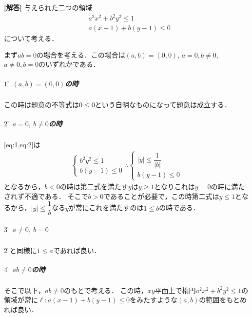 \documentclass[../../main.tex]{subfiles}
\begin{document}
\begin{oframed}
  
\end{oframed}

{\bf [解答]}
与えられた二つの領域
\begin{align}
  & a^2x^2 + b^2y^2 \le 1 \label{eq:1} \\
  & a(x-1) + b(y-1) \le 0 \label{eq:2}
\end{align}
について考える．

まず$ab=0$の場合を考える．この場合は$(a,b)=(0,0)$, $a=0,b\neq 0$, $a\neq 0, b=0$のいずれかである．

\subparagraph{$1^\circ$ $(a,b)=(0,0)$の時}

この時は題意の不等式は$0 \le 0$という自明なものになって題意は成立する．

\subparagraph{$2^\circ$ $a=0,\ b\ne0$の時}

\cref{eq:1,eq:2}は
\begin{align}
  \begin{cases}
    b^2y^2 \le 1 \\
    b(y-1) \le 0
  \end{cases}
  \therefore
  \begin{cases}
    |y| \le \dfrac{1}{|b|} \\
    b(y-1) \le 0
  \end{cases}
\end{align}
となるから，$b<0$の時は第二式を満たす$y$は$y \ge 1$となりこれは$y=0$の時に満たされず不適である．
そこで$b>0$であることが必要で，この時第二式は$y \le 1$となるから，$|y| \le \dfrac{1}{b}$なる$y$が常にこれを満たすのは$1\le b$の時である．

\subparagraph{$3^\circ$ $a\ne0,\ b=0$}

$2^\circ$と同様に$1\le a$であれば良い．

\subparagraph{$4^{\circ}$ $ab\neq 0$の時}
そこで以下，$ab\ne0$のもとで考える．
この時，$xy$平面上で楕円$a^2x^2+b^2y^2\le1$の領域が常に$\ell: a(x-1)+b(y-1)\le0$をみたすような$(a,b)$の範囲をもとめれば良い．
\end{document}
